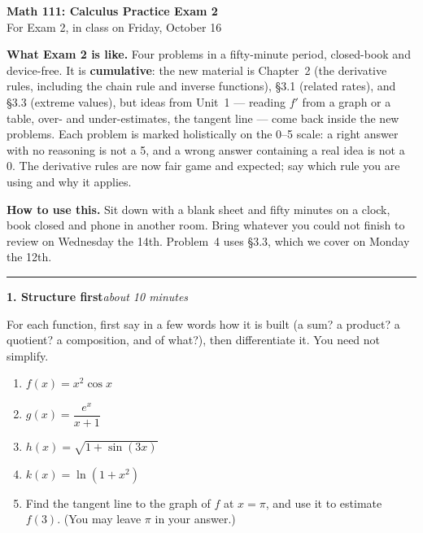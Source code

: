 \documentclass[11pt]{article}
\newcommand{\prob}[2]{\medskip\noindent\textbf{\large #1}\hfill\textit{#2}\par\smallskip}
\begin{document}
\begin{center}
{\Large\bfseries Math 111: Calculus \quad Practice Exam 2}\\[4pt]
{For Exam 2, in class on Friday, October 16}
\end{center}

\medskip
\noindent\textbf{What Exam 2 is like.} Four problems in a fifty-minute period, closed-book
and device-free. It is \textbf{cumulative}: the new material is Chapter~2 (the derivative
rules, including the chain rule and inverse functions), \S3.1 (related rates), and \S3.3
(extreme values), but ideas from Unit~1 --- reading $f'$ from a graph or a table,
over- and under-estimates, the tangent line --- come back inside the new problems. Each
problem is marked holistically on the 0--5 scale: a right answer with no reasoning is not a
5, and a wrong answer containing a real idea is not a 0. The derivative rules are now
fair game and expected; say which rule you are using and why it applies.

\smallskip
\noindent\textbf{How to use this.} Sit down with a blank sheet and fifty minutes on a
clock, book closed and phone in another room. Bring whatever you could not finish to
review on Wednesday the 14th. Problem~4 uses \S3.3, which we cover on Monday the 12th.

\bigskip\hrule

\prob{1. Structure first}{about 10 minutes}
For each function, first say in a few words how it is built (a sum? a product? a
quotient? a composition, and of what?), then differentiate it. You need not simplify.
\begin{enumerate}
\item $f(x) = x^2\cos x$
\item $g(x) = \dfrac{e^x}{x+1}$
\item $h(x) = \sqrt{1+\sin(3x)}$
\item $k(x) = \ln(1+x^2)$
\item Find the tangent line to the graph of $f$ at $x=\pi$, and use it to estimate
$f(3)$. (You may leave $\pi$ in your answer.)
\end{enumerate}
\end{document}
